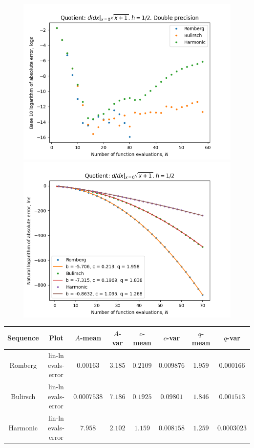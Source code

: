 \begin{figure}[H]
\centering
\begin{minipage}{0.45\textwidth}
\centering
\includegraphics[scale=0.45]{diff_quot_plots/sqrt_1.png}
\end{minipage}
\begin{minipage}{0.45\textwidth}
\centering
\includegraphics[scale=0.45]{diff_quot_plots/sqrt_1_hp_trend.png}
\end{minipage}
\end{figure}

\begin{table}[H]
    \centering
    \small
    \begin{tabular}{c|c||c|c|c|c|c|c}
Sequence & Plot & \(A\)-mean & \(A\)-var & \(c\)-mean & \(c\)-var & \(q\)-mean & \(q\)-var\\\hline
Romberg & lin-ln evals-error & \(0.00163\) & \(3.185\) & \(0.2109\) & \(0.009876\) & \(1.959\) & \(0.000166\) \\
Bulirsch & lin-ln evals-error & \(0.0007538\) & \(7.186\) & \(0.1925\) & \(0.09801\) & \(1.846\) & \(0.001513\) \\
Harmonic & lin-ln evals-error & \(7.958\) & \(2.102\) & \(1.159\) & \(0.008158\) & \(1.259\) & \(0.0003023\) \\
    \end{tabular}
    \label{tab:my_label}
\end{table}

